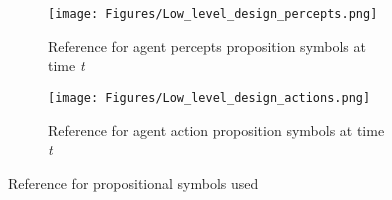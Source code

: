 \begin{figure}[H]
\captionsetup[subfigure]{justification=centering}
\centering
\begin{subfigure}{.5\textwidth}
    \centering
    \texttt{[image: Figures/Low\_level\_design\_percepts.png]}
    \caption{Reference for agent percepts proposition symbols at time \textit{t}} 
    \label{subfig:agent_in_env_low_level_percepts}
\end{subfigure}%
\begin{subfigure}{.5\textwidth}
    \centering
    \texttt{[image: Figures/Low\_level\_design\_actions.png]}
    \caption{Reference for agent action proposition symbols at time \textit{t}} 
    \label{subfig:agent_in_env_low_level_action}
\end{subfigure}
\caption{Reference for propositional symbols used}
\label{fig:test}
\end{figure}



